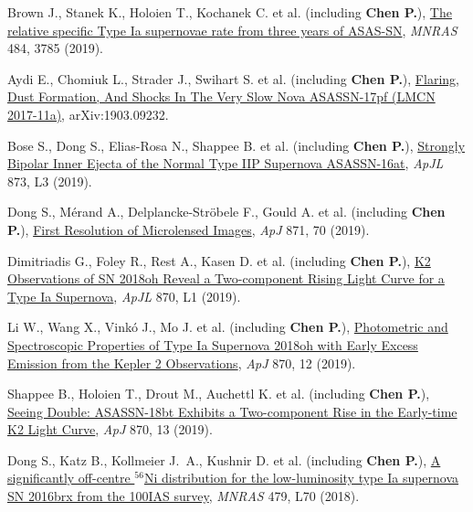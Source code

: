 \item Brown J., Stanek K., Holoien T., Kochanek C. et al. (including \textbf{Chen P.}), \href{https://ui.adsabs.harvard.edu/abs/2019MNRAS.484.3785B}{The relative specific Type Ia supernovae rate from three years of ASAS-SN}, \textit{MNRAS} 484, 3785 (2019).

\item Aydi E., Chomiuk L., Strader J., Swihart S. et al. (including \textbf{Chen P.}), \href{https://ui.adsabs.harvard.edu/abs/2019arXiv190309232A}{Flaring, Dust Formation, And Shocks In The Very Slow Nova ASASSN-17pf (LMCN 2017-11a)}, arXiv:1903.09232.

\item Bose S., Dong S., Elias-Rosa N., Shappee B. et al. (including \textbf{Chen P.}), \href{https://ui.adsabs.harvard.edu/abs/2019ApJ...873L...3B}{Strongly Bipolar Inner Ejecta of the Normal Type IIP Supernova ASASSN-16at}, \textit{ApJL} 873, L3 (2019).

\item Dong S., M{\'e}rand A., Delplancke-Str{\"o}bele F., Gould A. et al. (including \textbf{Chen P.}), \href{https://ui.adsabs.harvard.edu/abs/2019ApJ...871...70D}{First Resolution of Microlensed Images}, \textit{ApJ} 871, 70 (2019).

\item Dimitriadis G., Foley R., Rest A., Kasen D. et al. (including \textbf{Chen P.}), \href{https://ui.adsabs.harvard.edu/abs/2019ApJ...870L...1D}{K2 Observations of SN 2018oh Reveal a Two-component Rising Light Curve for a Type Ia Supernova}, \textit{ApJL} 870, L1 (2019).

\item Li W., Wang X., Vink{\'o} J., Mo J. et al. (including \textbf{Chen P.}), \href{https://ui.adsabs.harvard.edu/abs/2019ApJ...870...12L}{Photometric and Spectroscopic Properties of Type Ia Supernova 2018oh with Early Excess Emission from the Kepler 2 Observations}, \textit{ApJ} 870, 12 (2019).

\item Shappee B., Holoien T., Drout M., Auchettl K. et al. (including \textbf{Chen P.}), \href{https://ui.adsabs.harvard.edu/abs/2019ApJ...870...13S}{Seeing Double: ASASSN-18bt Exhibits a Two-component Rise in the Early-time K2 Light Curve}, \textit{ApJ} 870, 13 (2019).

\item Dong S., Katz B., Kollmeier J.~A., Kushnir D. et al. (including \textbf{Chen P.}), \href{https://ui.adsabs.harvard.edu/abs/2018MNRAS.479L..70D}{A significantly off-centre $^{56}$Ni distribution for the low-luminosity type Ia supernova SN 2016brx from the 100IAS survey}, \textit{MNRAS} 479, L70 (2018).

